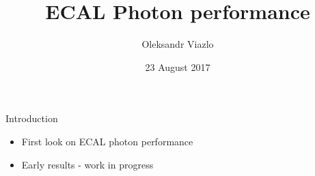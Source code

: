 \documentclass[8pt]{beamer}
\newif\ifplacelogo %
\begin{document}
\newcommand{\myNode}{\tikz[baseline,inner sep=1pt] \node[anchor=base]}



\title[ ECAL Photon performance \hspace{13.5em}\insertframenumber/
\inserttotalframenumber]{ ECAL Photon performance }


	\author[Oleksandr Viazlo]{Oleksandr Viazlo \\ 
	}
	
       
	\date{23 August 2017}


	
   	\frame{\titlepage}

   	

\placelogofalse

\begin{frame}{\large \large Introduction}
 
 \begin{itemize}
  \item First look on ECAL photon performance\\ \vspace{0.3cm}
  \item Early results - work in progress
 \end{itemize}

 
\end{frame}
\end{document}
